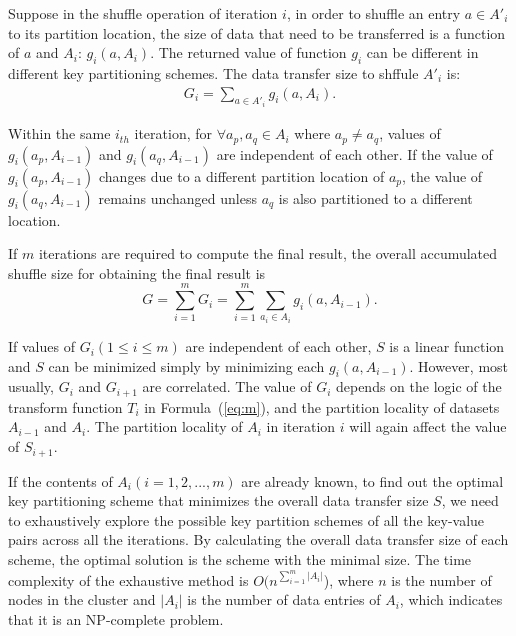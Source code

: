 \documentclass[10pt,journal,compsoc]{IEEEtran}
\begin{document}
Suppose in the shuffle operation of iteration $i$, in order to shuffle an entry $a \in A'_i$ to its partition location, 
the size of data that need to be transferred is a function of $a$ and $A_i$: $g_i(a,A_i)$. 
The returned value of function $g_i$ can be different in different key partitioning schemes. 
The data transfer size to shffule $A'_i$ is: 
\begin{equation}\label{eq:si}
\begin{aligned}
G_i=\sum_{a \in A'_i} g_i(a,A_i).
\end{aligned}
\end{equation}

Within the same $i_{th}$ iteration, for $\forall a_p, a_q \in A_i$ where $a_p \neq a_q$, values of $g_i(a_p,A_{i-1})$ and $g_i(a_q,A_{i-1})$ are independent of each other. 
If the value of $g_i(a_p,A_{i-1})$ changes due to a different partition location of $a_p$, the value of $g_i(a_q,A_{i-1})$ remains unchanged unless $a_q$ is also partitioned to a different location. 

If $m$ iterations are required to compute the final result, 
the overall accumulated shuffle size for obtaining the final result is
\begin{equation}\label{eq:s}
G=\sum_{i=1}^{m} G_i=\sum_{i=1}^{m} \sum_{a_i \in A_i} g_i(a,A_{i-1}).
\end{equation}


If values of $G_i (1 \leq i \leq m)$ are independent of each other, 
$S$ is a linear function and $S$ can be minimized simply by minimizing each $g_i(a,A_{i-1})$.
However, most usually, $G_i$ and $G_{i+1}$ are correlated.
The value of $G_i$ depends on the logic of the transform function $T_i$ in Formula~(\ref{eq:m}), 
and the partition locality of datasets $ A_{i-1}$ and $A_i$. 
The partition locality of $A_i$ in iteration $i$
will again affect the value of $S_{i+1}$.

If the contents of $A_i (i=1,2,...,m)$ are already known, to find out the optimal key partitioning scheme that minimizes 
the overall data transfer size $S$,  %
we need to exhaustively explore the possible key partition schemes of all the key-value pairs across all the iterations. 
By calculating the overall data transfer size of each scheme, the optimal solution is the scheme with the minimal size. 
The time complexity of the exhaustive method is $O(n^{\sum_{i=1}^{m} |A_i|}$), 
where $n$ is the number of nodes in the cluster and $|A_i|$ is the number of data entries of $A_i$, 
which indicates that it is an NP-complete problem. 
\end{document}
